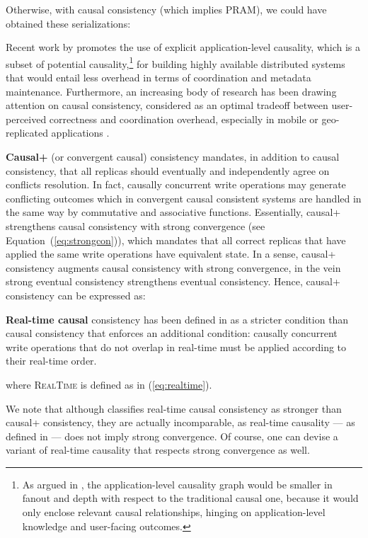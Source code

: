 \documentclass[letter, 11pt]{article}
\newcommand{\citeN}{\citet}
\renewcommand{\cite}{\citep}
\begin{document}
Otherwise, with causal consistency (which implies PRAM), we could have obtained these serializations:


Recent work by \citeN{Bailis.Fekete.ea:12} promotes the use of explicit application-level causality, 
which is a subset of potential causality,\footnote{As argued in \cite{Bailis.Fekete.ea:12},
the application-level causality graph would be smaller in fanout and depth with respect to 
the traditional causal one, because it would only enclose relevant causal relationships, 
hinging on application-level knowledge and user-facing outcomes.}
for building highly available distributed systems that would entail less overhead
in terms of coordination and metadata maintenance.
Furthermore, an increasing body of research has been drawing attention on causal consistency, considered
as an optimal tradeoff between user-perceived correctness and coordination overhead,
especially in mobile or geo-replicated applications \cite{Lloyd.Freedman.ea:11,Bailis.Ghodsi.ea:13,Zawirski.ea:15}. 

\textbf{Causal+} (or convergent causal) consistency \cite{Lloyd.Freedman.ea:11} mandates, 
in addition to causal consistency, 
that all replicas should eventually and independently agree on conflicts resolution.
In fact, causally concurrent write operations may generate conflicting outcomes
which in convergent causal consistent systems are handled in the same way by commutative and associative functions.
Essentially, causal+ strengthens causal consistency with strong convergence (see Equation~(\ref{eq:strongcon})), which mandates that all correct replicas that have applied the same write operations have equivalent state. In a sense, causal+ consistency augments causal consistency with strong convergence, in the vein strong eventual consistency \cite{Shapiro.ea:11} strengthens eventual consistency. Hence, causal+ consistency can be expressed as:



\textbf{Real-time causal} consistency has been defined in \cite{P-Mahajan.Dahlin:11} 
as a stricter condition than causal consistency that
enforces an additional condition: causally concurrent write operations that do not 
overlap in real-time must be applied according to their real-time order.

where \textsc{RealTime} is defined as in (\ref{eq:realtime}).

We note that although \cite{Lloyd.Freedman.ea:11} classifies real-time causal consistency as stronger than causal+ consistency, they are actually incomparable, as real-time causality --- as defined in \cite{P-Mahajan.Dahlin:11} --- does not imply strong convergence. Of course, one can devise a variant of real-time causality that respects strong convergence as well. 
\end{document}
